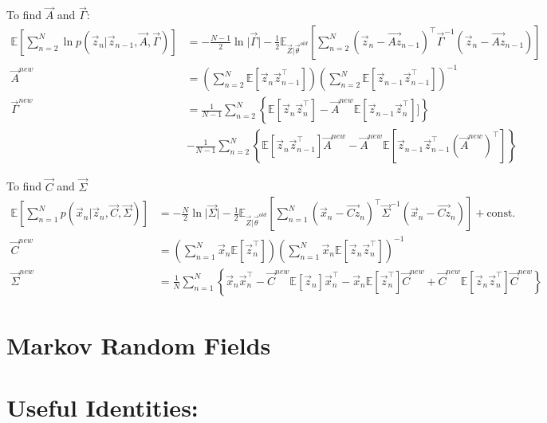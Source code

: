 \documentclass[12pt,twoside]{article}
\begin{document}
To find $\vec{A}$ and $\vec{\Gamma}$:
\begin{align*}
	 \mathbb{E}\left[\sum_{n=2}^N \ln p(\vec{z}_n \vert \vec{z}_{n-1}, \vec{A}, \vec{\Gamma})\right]
	 & = -\frac{N-1}{2}\ln \vert \vec{\Gamma} \vert -\frac{1}{2}\mathbb{E}_{\vec{Z}\vert \vec{\theta}^{old}} \left[\sum_{n=2}^N (\vec{z}_n - \vec{Az}_{n-1})^\top \vec{\Gamma}^{-1}(\vec{z}_n - \vec{Az}_{n-1})\right]\\
	 \vec{A}^{new}				& = \left(\sum_{n=2}^N \mathbb{E}[\vec{z}_n\vec{z}_{n-1}^\top]\right)\left(\sum_{n=2}^N\mathbb{E}[\vec{z}_{n-1}\vec{z}_{n-1}^\top]\right)^{-1}\\
	 \vec{\Gamma}^{new}	& = \frac{1}{N-1}\sum_{n=2}^N \left\lbrace \mathbb{E}[\vec{z}_n\vec{z}_n^\top] - \vec{A}^{new} \mathbb{E}[\vec{z}_{n-1}\vec{z}_n^\top]]\right\rbrace\\
	 &-\frac{1}{N-1}\sum_{n=2}^N \left\lbrace\mathbb{E}[\vec{z}_n\vec{z}_{n-1}^\top]\vec{A}^{new} - \vec{A}^{new}\mathbb{E}[\vec{z}_{n-1}\vec{z}_{n-1}^\top (\vec{A}^{new})^\top]\right\rbrace
\end{align*}

To find $\vec{C}$ and $\vec{\Sigma}$
\begin{align*}
	\mathbb{E}\left[\sum_{n=1}^N p(\vec{x}_n \vert \vec{z}_n, \vec{C}, \vec{\Sigma}) \right]& = -\frac{N}{2} \ln \vert \vec{\Sigma}\vert - \frac{1}{2}\mathbb{E}_{\vec{Z}\vert \vec{\theta}^{old}}\left[\sum_{n=1}^N(\vec{x}_n - \vec{Cz}_n)^\top\vec{\Sigma}^{-1}(\vec{x}_n - \vec{Cz}_n)\right] + \text{const.}\\
	\vec{C}^{new}			& = \left(\sum_{n=1}^N \vec{x}_n \mathbb{E}[\vec{z}_n^\top]\right)\left(\sum_{n=1}^N \vec{x}_n \mathbb{E}[\vec{z}_n\vec{z}_n^\top]\right)^{-1}\\
	\vec{\Sigma}^{new}	& = \frac{1}{N}\sum_{n=1}^N \left\lbrace \vec{x}_n\vec{x}_n^\top - \vec{C}^{new}\mathbb{E}[\vec{z}_n]\vec{x}_n^\top - \vec{x}_n\mathbb{E}[\vec{z}_n^\top]\vec{C}^{new}+\vec{C}^{new}\mathbb{E}[\vec{z}_n\vec{z}_n^\top]\vec{C}^{new} \right\rbrace
\end{align*}


\section{Markov Random Fields}




\section{Useful Identities:}
\end{document}
